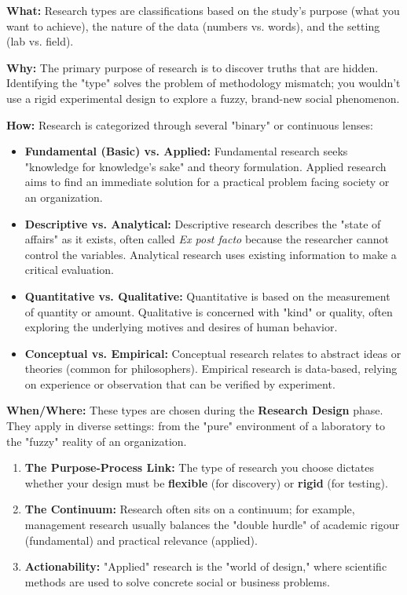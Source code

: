 \documentclass{report}
\begin{document}
\begin{layerReal}
    \textbf{What:} Research types are classifications based on the study's purpose (what you want to achieve), the nature of the data (numbers vs. words), and the setting (lab vs. field).
    
    
    \textbf{Why:} The primary purpose of research is to discover truths that are hidden. Identifying the "type" solves the problem of methodology mismatch; you wouldn't use a rigid experimental design to explore a fuzzy, brand-new social phenomenon.
    
    
    \textbf{How:} Research is categorized through several "binary" or continuous lenses:
    \begin{itemize}
        \item \textbf{Fundamental (Basic) vs. Applied:} Fundamental research seeks "knowledge for knowledge's sake" and theory formulation. Applied research aims to find an immediate solution for a practical problem facing society or an organization.
        \item \textbf{Descriptive vs. Analytical:} Descriptive research describes the "state of affairs" as it exists, often called \textit{Ex post facto} because the researcher cannot control the variables. Analytical research uses existing information to make a critical evaluation.
        \item \textbf{Quantitative vs. Qualitative:} Quantitative is based on the measurement of quantity or amount. Qualitative is concerned with "kind" or quality, often exploring the underlying motives and desires of human behavior.
        \item \textbf{Conceptual vs. Empirical:} Conceptual research relates to abstract ideas or theories (common for philosophers). Empirical research is data-based, relying on experience or observation that can be verified by experiment.
    \end{itemize}
    
    
    \textbf{When/Where:} These types are chosen during the \textbf{Research Design} phase. They apply in diverse settings: from the "pure" environment of a laboratory to the "fuzzy" reality of an organization.
\end{layerReal}

\begin{layerTakeaways}
    \begin{enumerate}
        \item \textbf{The Purpose-Process Link:} The type of research you choose dictates whether your design must be \textbf{flexible} (for discovery) or \textbf{rigid} (for testing).
        \item \textbf{The Continuum:} Research often sits on a continuum; for example, management research usually balances the "double hurdle" of academic rigour (fundamental) and practical relevance (applied).
        \item \textbf{Actionability:} "Applied" research is the "world of design," where scientific methods are used to solve concrete social or business problems.
    \end{enumerate}
\end{layerTakeaways}
\end{document}
